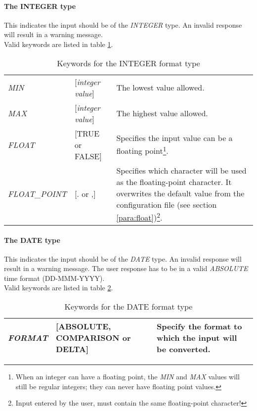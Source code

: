 \documentclass[a4paper]{book}
\begin{document}
\paragraph{The INTEGER type}
\label{para:mylabel4}

This indicates the input should be of the \textsl{INTEGER} 
type. An invalid response will 
result in a warning message. \\
Valid keywords are listed in table \ref{tab:integer}.

\begin{table}[ht]
\begin{minipage}[t]{\textwidth}
\begin{tabular}{llp{6cm}} \hline
\textsl{MIN} & [\textit{integer value}] & The lowest value allowed. \\
\textsl{MAX} & [\textit{integer value}] & The highest value allowed. \\
\textsl{FLOAT} & [\textsf{TRUE} or \textsf{FALSE}] & Specifies the input value can be a floating point\footnote{ When an integer can have a floating point, the \textsl{MIN} and 
\textsl{MAX} values will still be regular integers; they can never have 
floating point values.}. \\
\textsl{FLOAT\_POINT} & [\textsf{.} or \textsf{,}]&  Specifies which character will be used as the floating-point 
character. It overwrites the default value from the configuration 
file (see section \ref{para:float})\footnote{ Input entered by the user, must contain the same floating-point 
character!}.\\ \hline
\end{tabular}
\caption{Keywords for the INTEGER format type}\label{tab:integer}
\end{minipage}
\end{table}

\paragraph{The DATE type}

This indicates the input should be of the \textsl{DATE} type. An invalid response 
will result in a warning message. The user response has to be in a valid 
\textsl{ABSOLUTE} time format (DD-MMM-YYYY). \\
Valid keywords are listed in table \ref{tab:date}.

\begin{table}[ht]
\begin{minipage}[t]{\textwidth}
\begin{tabular}{llp{4cm}} \hline
\textsl{FORMAT} & [\textsf{ABSOLUTE}, \textsf{COMPARISON} or \textsf{DELTA}] & Specify the format to which the input will be converted.\\ \hline
\end{tabular}
\caption{Keywords for the DATE format type}\label{tab:date}
\end{minipage}
\end{table}
\end{document}
